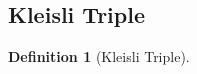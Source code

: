 \documentclass[a4paper]{article}
\theoremstyle{plain}
\theoremstyle{definition}
\newtheorem{definition}[theorem]{Definition}
\DeclareMathOperator{\Obj}{Obj}
\newcommand{\cat}[1]{\mathcal{#1}}
\begin{document}
\subsection{Kleisli Triple}
\begin{definition}[Kleisli Triple]
\end{definition}
\end{document}
